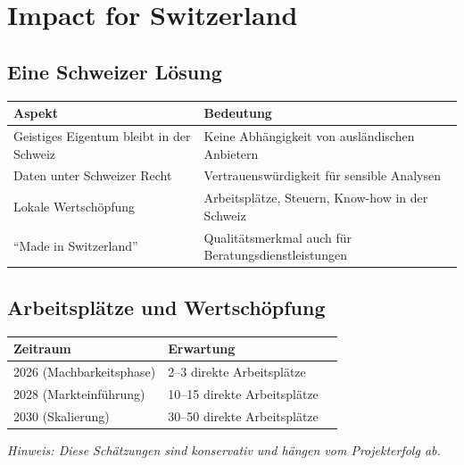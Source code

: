 \documentclass[11pt,a4paper]{article}
\begin{document}
\newpage

\section{Impact for Switzerland}

\subsection{Eine Schweizer Lösung}

\begin{table}[h]
\centering
\begin{tabularx}{\textwidth}{lX}
\toprule
\textbf{Aspekt} & \textbf{Bedeutung} \\
\midrule
Geistiges Eigentum bleibt in der Schweiz & Keine Abhängigkeit von ausländischen Anbietern \\
Daten unter Schweizer Recht & Vertrauenswürdigkeit für sensible Analysen \\
Lokale Wertschöpfung & Arbeitsplätze, Steuern, Know-how in der Schweiz \\
``Made in Switzerland'' & Qualitätsmerkmal auch für Beratungsdienstleistungen \\
\bottomrule
\end{tabularx}
\end{table}

\subsection{Arbeitsplätze und Wertschöpfung}

\begin{table}[h]
\centering
\begin{tabular}{lll}
\toprule
\textbf{Zeitraum} & \textbf{Erwartung} \\
\midrule
2026 (Machbarkeitsphase) & 2--3 direkte Arbeitsplätze \\
2028 (Markteinführung) & 10--15 direkte Arbeitsplätze \\
2030 (Skalierung) & 30--50 direkte Arbeitsplätze \\
\bottomrule
\end{tabular}
\end{table}

\textit{Hinweis: Diese Schätzungen sind konservativ und hängen vom Projekterfolg ab.}
\end{document}
